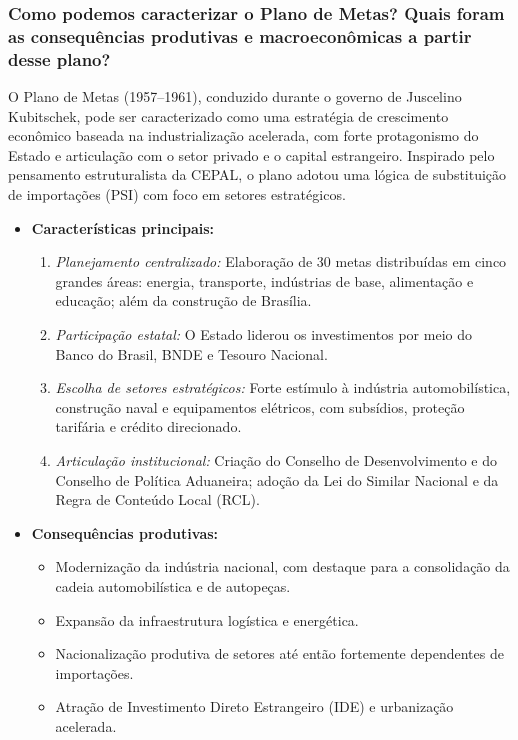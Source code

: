 \documentclass[a4paper,12pt]{article}[abntex2]
\begin{document}
\subsubsection{\textbf{Como podemos caracterizar o Plano de Metas? Quais foram as consequências produtivas e macroeconômicas a partir desse plano?}}

O Plano de Metas (1957--1961), conduzido durante o governo de Juscelino Kubitschek, pode ser caracterizado como uma estratégia de crescimento econômico baseada na industrialização acelerada, com forte protagonismo do Estado e articulação com o setor privado e o capital estrangeiro. Inspirado pelo pensamento estruturalista da CEPAL, o plano adotou uma lógica de substituição de importações (PSI) com foco em setores estratégicos.

\begin{itemize}
    \item \textbf{Características principais:}
    \begin{enumerate}
        \item \textit{Planejamento centralizado:} Elaboração de 30 metas distribuídas em cinco grandes áreas: energia, transporte, indústrias de base, alimentação e educação; além da construção de Brasília.
        \item \textit{Participação estatal:} O Estado liderou os investimentos por meio do Banco do Brasil, BNDE e Tesouro Nacional.
        \item \textit{Escolha de setores estratégicos:} Forte estímulo à indústria automobilística, construção naval e equipamentos elétricos, com subsídios, proteção tarifária e crédito direcionado.
        \item \textit{Articulação institucional:} Criação do Conselho de Desenvolvimento e do Conselho de Política Aduaneira; adoção da Lei do Similar Nacional e da Regra de Conteúdo Local (RCL).
    \end{enumerate}

    \item \textbf{Consequências produtivas:}
    \begin{itemize}
        \item Modernização da indústria nacional, com destaque para a consolidação da cadeia automobilística e de autopeças.
        \item Expansão da infraestrutura logística e energética.
        \item Nacionalização produtiva de setores até então fortemente dependentes de importações.
        \item Atração de Investimento Direto Estrangeiro (IDE) e urbanização acelerada.
    \end{itemize}


\end{itemize}
\end{document}
